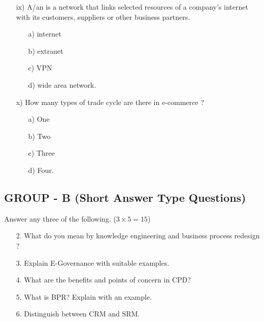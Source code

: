 \documentclass{article}
\begin{document}
\begin{enumerate}
    \item[ix)] A/an \underline{\hspace{2cm}} is a network that links selected resources of a company's internet with its customers, suppliers or other business partners.
    \begin{enumerate}
        \item[a)] internet
        \item[b)] extranet
        \item[c)] VPN
        \item[d)] wide area network.
    \end{enumerate}
    \item[x)] How many types of trade cycle are there in e-commerce ?
    \begin{enumerate}
        \item[a)] One
        \item[b)] Two
        \item[c)] Three
        \item[d)] Four.
    \end{enumerate}
\end{enumerate}

\subsection*{GROUP - B (Short Answer Type Questions)}
Answer any three of the following. ($3 \times 5 = 15$)
\begin{enumerate}
    \item[2.] What do you mean by knowledge engineering and business process redesign ?
    \item[3.] Explain E-Governance with suitable examples.
    \item[4.] What are the benefits and points of concern in CPD?
    \item[5.] What is BPR? Explain with an example.
    \item[6.] Distinguish between CRM and SRM.
\end{enumerate}
\end{document}
